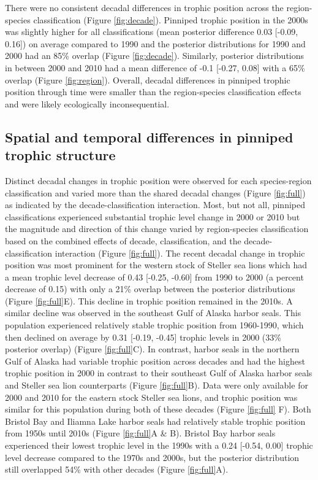 \documentclass [11pt, proquest] {uwthesis}[2015/03/03]
\begin{document}
There were no consistent decadal differences in trophic position across
the region-species classification (Figure \ref{fig:decade}). Pinniped
trophic position in the 2000s was slightly higher for all
classifications (mean posterior difference 0.03 {[}-0.09, 0.16{]}) on
average compared to 1990 and the posterior distributions for 1990 and
2000 had an 85\% overlap (Figure \ref{fig:decade}). Similarly, posterior
distributions in between 2000 and 2010 had a mean difference of -0.1
{[}-0.27, 0.08{]} with a 65\% overlap (Figure \ref{fig:region}).
Overall, decadal differences in pinniped trophic position through time
were smaller than the region-species classification effects and were
likely ecologically inconsequential.

\subsection{Spatial and temporal differences in pinniped trophic
structure}\label{spatial-and-temporal-differences-in-pinniped-trophic-structure}

Distinct decadal changes in trophic position were observed for each
species-region classification and varied more than the shared decadal
changes (Figure \ref{fig:full}) as indicated by the
decade-classification interaction. Most, but not all, pinniped
classifications experienced substantial trophic level change in 2000 or
2010 but the magnitude and direction of this change varied by
region-species classification based on the combined effects of decade,
classification, and the decade-classification interaction (Figure
\ref{fig:full}). The recent decadal change in trophic position was most
prominent for the western stock of Steller sea lions which had a mean
trophic level decrease of 0.43 {[}-0.25, -0.60{]} from 1990 to 2000 (a
percent decrease of 0.15) with only a 21\% overlap between the posterior
distributions (Figure \ref{fig:full}E). This decline in trophic position
remained in the 2010s. A similar decline was observed in the southeast
Gulf of Alaska harbor seals. This population experienced relatively
stable trophic position from 1960-1990, which then declined on average
by 0.31 {[}-0.19, -0.45{]} trophic levels in 2000 (33\% posterior
overlap) (Figure \ref{fig:full}C). In contrast, harbor seals in the
northern Gulf of Alaska had variable trophic position across decades and
had the highest trophic position in 2000 in contrast to their southeast
Gulf of Alaska harbor seals and Steller sea lion counterparts (Figure
\ref{fig:full}B). Data were only available for 2000 and 2010 for the
eastern stock Steller sea lions, and trophic position was similar for
this population during both of these decades (Figure \ref{fig:full} F).
Both Bristol Bay and Iliamna Lake harbor seals had relatively stable
trophic position from 1950s until 2010s (Figure \ref{fig:full}A \& B).
Bristol Bay harbor seals experienced their lowest trophic level in the
1990s with a 0.24 {[}-0.54, 0.00{]} trophic level decrease compared to
the 1970s and 2000s, but the posterior distribution still overlapped
54\% with other decades (Figure \ref{fig:full}A).
\end{document}
